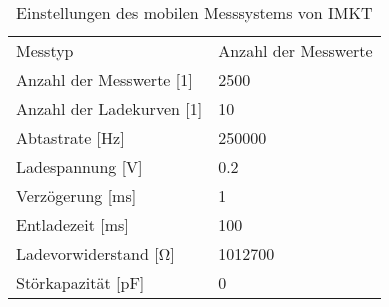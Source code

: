 \begin{table}[htbp]
    \centering
    \caption{Einstellungen des mobilen Messsystems von IMKT}
    \begin{tabular}{ll}
        Messtyp                          & Anzahl der Messwerte \\
        Anzahl der Messwerte [\si{1}]    & 2500                 \\
        Anzahl der Ladekurven [\si{1}]   & 10                   \\
        Abtastrate [\si{\Hz}]            & 250000               \\
        Ladespannung [\si{\volt}]        & 0.2                  \\
        Verzögerung [\si{\ms}]           & 1                    \\
        Entladezeit [\si{\ms}]           & 100                  \\
        Ladevorwiderstand [\si{\ohm}]    & 1012700              \\
        Störkapazität [\si{\pico\farad}] & 0                    \\
    \end{tabular}
    \label{tab:einstellungen_des_ladekurve_messsystems}
\end{table}

